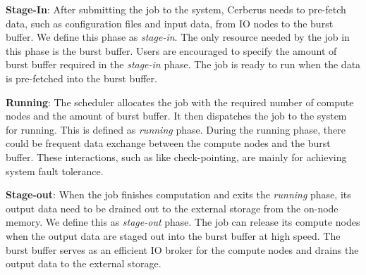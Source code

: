 \textbf{Stage-In}: After submitting the job to the system,
         Cerberus needs to pre-fetch data, such as configuration files and input data,
         from IO nodes to the burst buffer. We define this phase as \textit{stage-in}.
         The only resource needed by the job in this phase is the burst buffer.
         Users are encouraged to specify the amount of burst buffer required in the \textit{stage-in} phase.
         The job is ready to run when the data is pre-fetched into the burst buffer.
 
\textbf{Running}: The scheduler allocates the job with the required
         number of compute nodes and the amount of burst buffer. 
         It then dispatches the job to the system for running.
         This is defined as \textit{running} phase.
         During the running phase, there could be frequent data exchange
         between the compute nodes and the burst buffer.
         These interactions, such as like check-pointing, are mainly for achieving system fault tolerance. 
 
\textbf{Stage-out}: When the job finishes computation and
         exits the \textit{running} phase, its output data need to be drained out
         to the external storage from the on-node memory. We define this as \textit{stage-out} phase.
         The job can release its compute nodes when the output data are staged out
         into the burst buffer at high speed. The burst buffer serves as an efficient
         IO broker for the compute nodes and drains the output data to the external storage.



